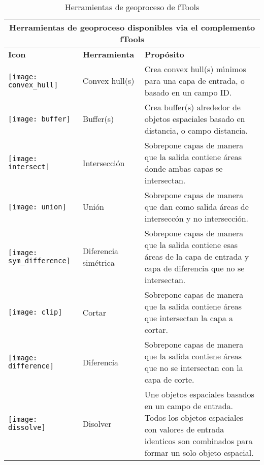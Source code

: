 \begin{table}[ht]
\centering
\caption{Herramientas de geoproceso de fTools}\label{tab:ftool_geoprocessing}\medskip
 \begin{tabular}{|p{0.3in}|p{0.8in}|p{5.1in}|}
 \hline \multicolumn{3}{|c|}{\textbf{Herramientas de geoproceso disponibles via el complemento fTools}} \\
 \hline \textbf{Icon} & \textbf{Herramienta} & \textbf{Prop\'osito} \\
 \hline \texttt{[image: convex\_hull]} & Convex hull(s) & Crea 
convex hull(s) m\'{\i}nimos para una capa de entrada, o basado en un campo ID. \\
 \hline \texttt{[image: buffer]} & Buffer(s) & Crea 
buffer(s) alrededor de objetos espaciales basado en distancia, o campo distancia. \\
 \hline \texttt{[image: intersect]} & Intersecci\'on & Sobrepone 
capas de manera que la salida contiene \'areas donde ambas capas se intersectan. \\
 \hline \texttt{[image: union]} & Uni\'on & Sobrepone capas de manera que 
dan como salida \'areas de intersecc\'on y no intersecci\'on. \\
 \hline \texttt{[image: sym\_difference]} & Diferencia sim\'etrica & 
Sobrepone capas de manera que la salida contiene esas \'areas de la capa de entrada y capa 
de diferencia que no se intersectan.\\
 \hline \texttt{[image: clip]} & Cortar & Sobrepone capas de manera 
que la salida contiene \'areas que intersectan la capa a cortar. \\
 \hline \texttt{[image: difference]} & Diferencia & Sobrepone capas 
de manera que la salida contiene \'areas que no se intersectan con la capa de corte. \\
 \hline \texttt{[image: dissolve]} & Disolver & Une objetos espaciales 
basados en un campo de entrada. Todos los objetos espaciales con valores de entrada identicos son combinados 
para formar un solo objeto espacial. \\
 \hline
\end{tabular}
\end{table}

